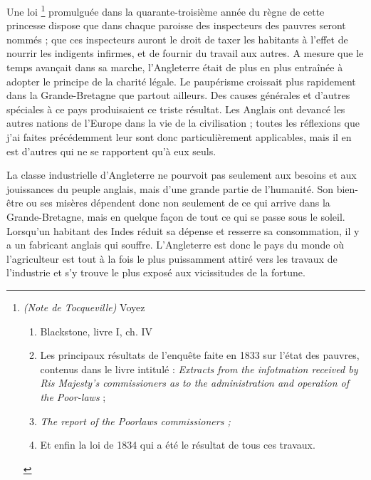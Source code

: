 \documentclass[french,twoside]{book} %
\begin{document}
Une loi \footnote{ \noindent \emph{(Note de Tocqueville)} Voyez\par
 
\begin{enumerate}[itemsep=0pt,]
\item Blackstone, livre I, ch. IV
\item Les principaux résultats de l’enquête faite en 1833 sur l’état des pauvres, contenus dans le livre intitulé : \emph{Extracts from the infotmation received by Ris Majesty's commissioners as to the administration and operation of the Poor-laws} ;
\item \emph{The report of the Poorlaws commissioners ;}
\item Et enfin la loi de 1834 qui a été le résultat de tous ces travaux.

\end{enumerate}} promulguée dans la quarante-troisième année du règne de cette princesse dispose que dans chaque paroisse des inspecteurs des pauvres seront nommés ; que ces inspecteurs auront le droit de taxer les habitants à l’effet de nourrir les indigents infirmes, et de fournir du travail aux autres. A mesure que le temps avançait dans sa marche, l’Angleterre était de plus en plus entraînée à adopter le principe de la charité légale. Le paupérisme croissait plus rapidement dans la Grande-Bretagne que partout ailleurs. Des causes générales et d’autres spéciales à ce pays produisaient ce triste résultat. Les Anglais ont devancé les autres nations de l’Europe dans la vie de la civilisation ; toutes les réflexions que j’ai faites précédemment leur sont donc particulièrement applicables, mais il en est d’autres qui ne se rapportent qu’à eux seuls.\par
\bigbreak
\noindent La classe industrielle d’Angleterre ne pourvoit pas seulement aux besoins et aux jouissances du peuple anglais, mais d’une grande partie de l’humanité. Son bien-être ou ses misères dépendent donc non seulement de ce qui arrive dans la Grande-Bretagne, mais en quelque façon de tout ce qui se passe sous le soleil. Lorsqu’un habitant des Indes réduit sa dépense et resserre sa consommation, il y a un fabricant anglais qui souffre. L’Angleterre est donc le pays du monde où l’agriculteur est tout à la fois le plus puissamment attiré vers les travaux de l’industrie et s’y trouve le plus exposé aux vicissitudes de la fortune.\par
\end{document}
